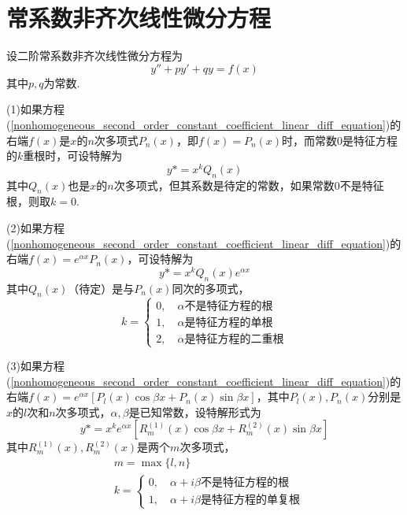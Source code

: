 \section{常系数非齐次线性微分方程}
设二阶常系数非齐次线性微分方程为
\begin{equation}
    y''+py'+qy=f(x) \label{nonhomogeneous_second_order_constant_coefficient_linear_diff_equation}
\end{equation}
其中$p,q$为常数.

(1)如果方程(\ref{nonhomogeneous_second_order_constant_coefficient_linear_diff_equation})的右端$f(x)$是$x$的$n$次多项式$P_n(x)$，即$f(x)=P_n(x)$时，而常数0是特征方程的$k$重根时，可设特解为
\begin{equation*}
    y*=x^kQ_n(x)
\end{equation*}
其中$Q_n(x)$也是$x$的$n$次多项式，但其系数是待定的常数，如果常数0不是特征根，则取$k=0$.

(2)如果方程(\ref{nonhomogeneous_second_order_constant_coefficient_linear_diff_equation})的右端$f(x)=e^{\alpha x}P_n(x)$，可设特解为
\begin{equation*}
    y*=x^kQ_n(x)e^{\alpha x}
\end{equation*}
其中$Q_n(x)$（待定）是与$P_n(x)$同次的多项式，
\begin{equation*}
    k=
    \begin{cases}
        0, \quad \alpha\mbox{不是特征方程的根} \\
        1, \quad \alpha\mbox{是特征方程的单根} \\
        2, \quad \alpha\mbox{是特征方程的二重根}
    \end{cases}
\end{equation*}

(3)如果方程(\ref{nonhomogeneous_second_order_constant_coefficient_linear_diff_equation})的右端$f(x)=e^{\alpha x}[P_l(x)\cos\beta x+P_n(x)\sin\beta x]$，其中$P_l(x),P_n(x)$分别是$x$的$l$次和$n$次多项式，$\alpha,\beta$是已知常数，设特解形式为
\begin{equation*}
    y*=x^ke^{\alpha x}[R_m^{(1)}(x)\cos\beta x+R_m^{(2)}(x)\sin\beta x]
\end{equation*}
其中$R_m^{(1)}(x),R_m^{(2)}(x)$是两个$m$次多项式，
\begin{align*}
    & m=\max\{l,n\} \\
    & k=
    \begin{cases}
        0, \quad \alpha+i\beta\mbox{不是特征方程的根} \\
        1, \quad \alpha+i\beta\mbox{是特征方程的单复根}
    \end{cases}
\end{align*}
